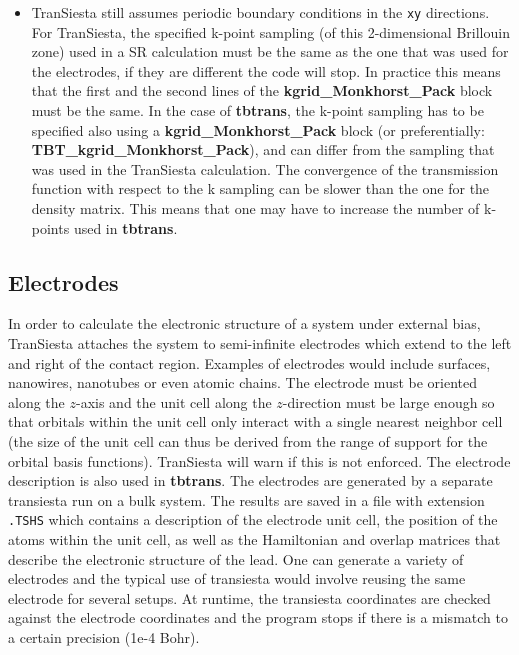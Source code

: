 \documentclass[11pt]{article}
\begin{document}
\begin{itemize}
\item
{\sc TranSiesta} still assumes periodic boundary conditions in the
{\tt xy} directions.  For {\sc TranSiesta}, the specified k-point
sampling (of this 2-dimensional Brillouin zone) used in a SR
calculation must be the same as the one that was used for the
electrodes, if they are different the code will stop. In practice this
means that the first and the second lines of the {\bf
  kgrid\_Monkhorst\_Pack} block must be the same.  In the case of {\bf
  tbtrans}, the k-point sampling has to be specified also using a {\bf
  kgrid\_Monkhorst\_Pack} block (or preferentially:
{\bf TBT\_kgrid\_Monkhorst\_Pack}), 
and can differ from the sampling that was used in the {\sc TranSiesta} 
calculation. The convergence of the transmission function with respect
to the k sampling can be slower than the one for the density matrix. 
This means that one may have to increase the number of k-points used 
in {\bf tbtrans}.
\end{itemize}

\subsection{Electrodes}

In order to calculate the electronic structure of a system under
external bias, {\sc TranSiesta} attaches the system to semi-infinite
electrodes which extend to the left and right of the contact
region. Examples of electrodes would include surfaces, nanowires,
nanotubes or even atomic chains. The electrode must be oriented along
the $z$-axis and the unit cell along the $z$-direction must be large
enough so that orbitals within the unit cell only interact with a
single nearest neighbor cell (the size of the unit cell can thus be
derived from the range of support for the orbital basis
functions). {\sc TranSiesta} will warn if this is not enforced.
 The electrode description is also used in {\bf tbtrans}.
The electrodes are generated by a separate transiesta run on a bulk
system.  The results are saved in a file with extension {\tt .TSHS}
which contains a description of the electrode unit cell, the position
of the atoms within the unit cell, as well as the Hamiltonian and
overlap matrices that describe the electronic structure of the
lead. One can generate a variety of electrodes and the typical use of
transiesta would involve reusing the same electrode for several
setups. At runtime, the transiesta coordinates 
are checked against the electrode coordinates and the program stops if 
there is a mismatch to a certain precision (1e-4 Bohr).
\end{document}
